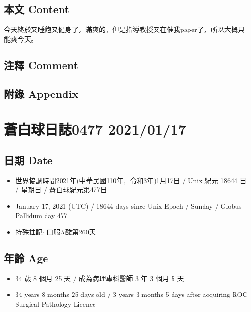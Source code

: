 \documentclass[a5paper, 10pt
]{book}
\providecommand{\tightlist}{%
  \setlength{\itemsep}{0pt}\setlength{\parskip}{0pt}}
\begin{document}
\hypertarget{ux672cux6587-content-46}{%
\subsection{本文 Content}\label{ux672cux6587-content-46}}

今天終於又睡飽又健身了，滿爽的，但是指導教授又在催我paper了，所以大概只能爽今天。

\hypertarget{ux6ce8ux91cb-comment-46}{%
\subsection{注釋 Comment}\label{ux6ce8ux91cb-comment-46}}

\hypertarget{ux9644ux9304-appendix-46}{%
\subsection{附錄 Appendix}\label{ux9644ux9304-appendix-46}}

\hypertarget{ux84bcux767dux7403ux65e5ux8a8c0477-20210117}{%
\section{蒼白球日誌0477
2021/01/17}\label{ux84bcux767dux7403ux65e5ux8a8c0477-20210117}}

\hypertarget{ux65e5ux671f-date-47}{%
\subsection{日期 Date}\label{ux65e5ux671f-date-47}}

\begin{itemize}
\tightlist
\item
  世界協調時間2021年(中華民國110年，令和3年)1月17日 / Unix 紀元 18644 日
  / 星期日 / 蒼白球紀元第477日
\item
  January 17, 2021 (UTC) / 18644 days since Unix Epoch / Sunday / Globus
  Pallidum day 477
\item
  特殊註記: 口服A酸第260天
\end{itemize}

\hypertarget{ux5e74ux9f61-age-47}{%
\subsection{年齡 Age}\label{ux5e74ux9f61-age-47}}

\begin{itemize}
\tightlist
\item
  34 歲 8 個月 25 天 / 成為病理專科醫師 3 年 3 個月 5 天
\item
  34 years 8 months 25 days old / 3 years 3 months 5 days after
  acquiring ROC Surgical Pathology Licence
\end{itemize}
\end{document}
